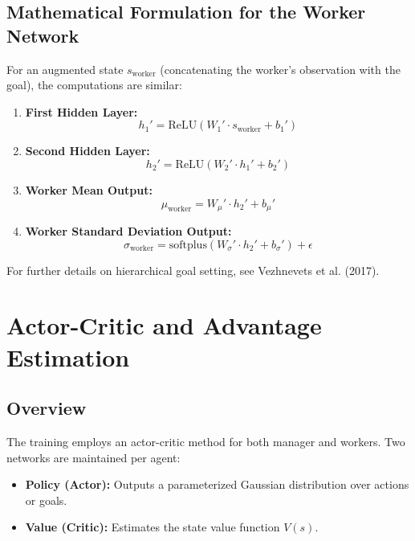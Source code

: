 \documentclass{article}
\begin{document}
\subsection{Mathematical Formulation for the Worker Network}
For an augmented state \( s_{\text{worker}} \) (concatenating the worker's observation with the goal), the computations are similar:
\begin{enumerate}[label=(\arabic*)]
    \item \textbf{First Hidden Layer:}
    \[
    h_1' = \text{ReLU}(W_1' \cdot s_{\text{worker}} + b_1')
    \]
    
    \item \textbf{Second Hidden Layer:}
    \[
    h_2' = \text{ReLU}(W_2' \cdot h_1' + b_2')
    \]
    
    \item \textbf{Worker Mean Output:}
    \[
    \mu_{\text{worker}} = W_\mu' \cdot h_2' + b_\mu'
    \]
    
    \item \textbf{Worker Standard Deviation Output:}
    \[
    \sigma_{\text{worker}} = \text{softplus}(W_\sigma' \cdot h_2' + b_\sigma') + \epsilon
    \]
\end{enumerate}
For further details on hierarchical goal setting, see Vezhnevets et al. (2017).

\section{Actor-Critic and Advantage Estimation}

\subsection{Overview}
The training employs an actor-critic method for both manager and workers. Two networks are maintained per agent:
\begin{itemize}
    \item \textbf{Policy (Actor):} Outputs a parameterized Gaussian distribution over actions or goals.
    \item \textbf{Value (Critic):} Estimates the state value function \( V(s) \).
\end{itemize}
\end{document}
